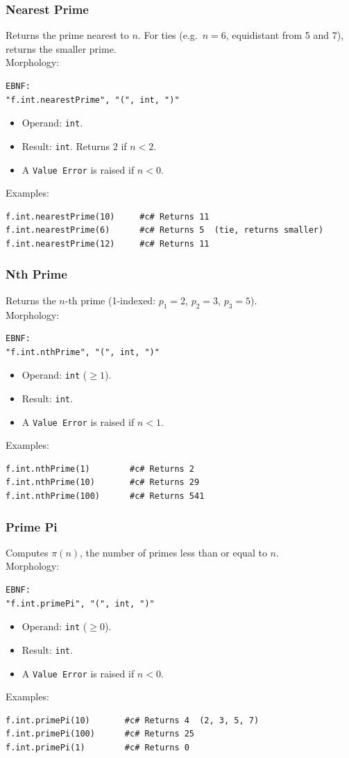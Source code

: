 \subsubsection{Nearest Prime}
Returns the prime nearest to $n$. For ties (e.g.\ $n = 6$, equidistant from 5 and 7), returns the smaller prime. \\
Morphology:
\begin{verbatim}
EBNF:
"f.int.nearestPrime", "(", int, ")"
\end{verbatim}
\begin{itemize}
\item Operand: \texttt{int}.
\item Result: \texttt{int}. Returns $2$ if $n < 2$.
\item A \texttt{Value Error} is raised if $n < 0$.
\end{itemize}
Examples:
\begin{verbatim}
f.int.nearestPrime(10)     #c# Returns 11
f.int.nearestPrime(6)      #c# Returns 5  (tie, returns smaller)
f.int.nearestPrime(12)     #c# Returns 11
\end{verbatim}

\subsubsection{Nth Prime}
Returns the $n$-th prime (1-indexed: $p_1 = 2$, $p_2 = 3$, $p_3 = 5$). \\
Morphology:
\begin{verbatim}
EBNF:
"f.int.nthPrime", "(", int, ")"
\end{verbatim}
\begin{itemize}
\item Operand: \texttt{int} ($\geq 1$).
\item Result: \texttt{int}.
\item A \texttt{Value Error} is raised if $n < 1$.
\end{itemize}
Examples:
\begin{verbatim}
f.int.nthPrime(1)        #c# Returns 2
f.int.nthPrime(10)       #c# Returns 29
f.int.nthPrime(100)      #c# Returns 541
\end{verbatim}

\subsubsection{Prime Pi}
Computes $\pi(n)$, the number of primes less than or equal to $n$. \\
Morphology:
\begin{verbatim}
EBNF:
"f.int.primePi", "(", int, ")"
\end{verbatim}
\begin{itemize}
\item Operand: \texttt{int} ($\geq 0$).
\item Result: \texttt{int}.
\item A \texttt{Value Error} is raised if $n < 0$.
\end{itemize}
Examples:
\begin{verbatim}
f.int.primePi(10)       #c# Returns 4  (2, 3, 5, 7)
f.int.primePi(100)      #c# Returns 25
f.int.primePi(1)        #c# Returns 0
\end{verbatim}


